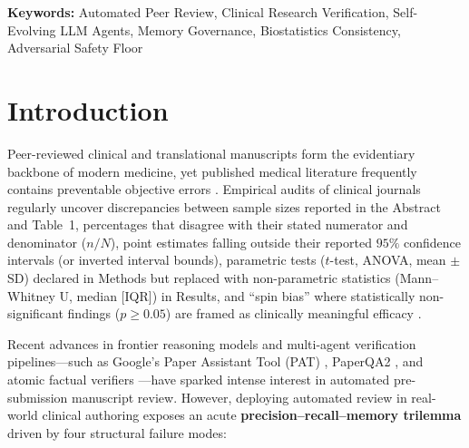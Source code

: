 \documentclass[11pt,a4paper]{article}
\begin{document}
\vspace{3pt}
\noindent\textbf{Keywords:} Automated Peer Review, Clinical Research Verification, Self-Evolving LLM Agents, Memory Governance, Biostatistics Consistency, Adversarial Safety Floor

\section{Introduction}
\label{sec:intro}

Peer-reviewed clinical and translational manuscripts form the evidentiary backbone of modern medicine, yet published medical literature frequently contains preventable objective errors \cite{schulz2010consort,vandenbroucke2007strobe,boutron2010spin}. Empirical audits of clinical journals regularly uncover discrepancies between sample sizes reported in the Abstract and Table~1, percentages that disagree with their stated numerator and denominator ($n/N$), point estimates falling outside their reported $95\%$ confidence intervals (or inverted interval bounds), parametric tests ($t$-test, ANOVA, mean $\pm$ SD) declared in Methods but replaced with non-parametric statistics (Mann--Whitney U, median [IQR]) in Results, and ``spin bias'' where statistically non-significant findings ($p \ge 0.05$) are framed as clinically meaningful efficacy \cite{boutron2010spin,page2021prisma,bossuyt2015stard}.

Recent advances in frontier reasoning models \cite{deepseekv3_2024,deepseekr1_2025} and multi-agent verification pipelines---such as Google's Paper Assistant Tool (PAT) \cite{googlepat2026}, PaperQA2 \cite{skarlinski2024paperqa2}, and atomic factual verifiers \cite{min2023factscore,gao2023alce}---have sparked intense interest in automated pre-submission manuscript review. However, deploying automated review in real-world clinical authoring exposes an acute \textbf{precision--recall--memory trilemma} driven by four structural failure modes:
\end{document}
